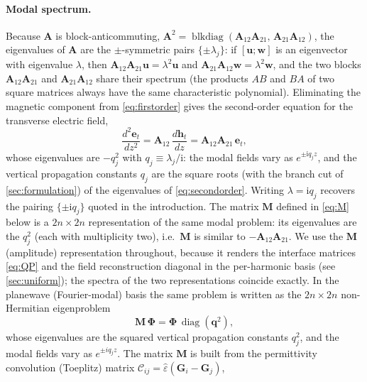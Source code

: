 \documentclass[11pt]{article}
\theoremstyle{remark}
\newcommand{\eps}{\varepsilon}
\newcommand{\Cmat}{\mathcal{C}}
\newcommand{\Ph}{\mathbf{\Phi}}
\newcommand{\fq}{\mathbf{q}}
\DeclareMathOperator{\diag}{diag}
\DeclareMathOperator{\blkdiag}{blkdiag}
\newcommand{\ii}{\mathrm{i}}
\begin{document}
\paragraph{Modal spectrum.}
Because $\mathbf{A}$ is block-anticommuting,
$\mathbf{A}^2=\blkdiag(\mathbf{A}_{12}\mathbf{A}_{21},\,
\mathbf{A}_{21}\mathbf{A}_{12})$, the eigenvalues of $\mathbf{A}$ are the
$\pm$-symmetric pairs $\{\pm\lambda_j\}$: if $[\mathbf{u};\mathbf{w}]$ is an
eigenvector with eigenvalue $\lambda$, then
$\mathbf{A}_{12}\mathbf{A}_{21}\mathbf{u}=\lambda^2\mathbf{u}$ and
$\mathbf{A}_{21}\mathbf{A}_{12}\mathbf{w}=\lambda^2\mathbf{w}$, and the two
blocks $\mathbf{A}_{12}\mathbf{A}_{21}$ and
$\mathbf{A}_{21}\mathbf{A}_{12}$ share their spectrum (the products
$AB$ and $BA$ of two square matrices always have the same characteristic
polynomial).  Eliminating the magnetic
component from \eqref{eq:firstorder} gives the second-order equation for the
transverse electric field,
\begin{equation}
\frac{d^2\mathbf{e}_t}{dz^2}
=\mathbf{A}_{12}\,\frac{d\mathbf{h}_t}{dz}
=\mathbf{A}_{12}\mathbf{A}_{21}\,\mathbf{e}_t,
\label{eq:secondorder}
\end{equation}
whose eigenvalues are $-q_j^2$ with $q_j\equiv\lambda_j/\ii$: the modal fields
vary as $e^{\pm \ii q_j z}$, and the vertical propagation constants
$q_j$ are the square roots (with the branch cut of \cref{sec:formulation}) of
the eigenvalues of \eqref{eq:secondorder}.  Writing $\lambda=\ii q_j$ recovers
the pairing $\{\pm \ii q_j\}$ quoted in the introduction.  The matrix
$\mathbf{M}$ defined in \eqref{eq:M} below is a $2n\times2n$ representation of
the same modal problem: its eigenvalues are the $q_j^2$ (each with multiplicity
two), i.e.\ $\mathbf{M}$ is similar to $-\mathbf{A}_{12}\mathbf{A}_{21}$.  We
use the $\mathbf{M}$ (amplitude) representation throughout, because it renders
the interface matrices \eqref{eq:QP} and the field reconstruction diagonal in
the per-harmonic basis (see \cref{sec:uniform}); the spectra of the two
representations coincide exactly.
In the planewave (Fourier-modal) basis the
same problem is written as the $2n\times2n$ non-Hermitian eigenproblem
\begin{equation}
\mathbf{M}\,\Ph=\Ph\,\diag(\fq^{2}),
\label{eq:eig}
\end{equation}
whose eigenvalues are the squared vertical propagation constants $q_j^2$, and
the modal fields vary as $e^{\pm i q_j z}$. The matrix $\mathbf{M}$ is built
from the permittivity convolution (Toeplitz) matrix
$\Cmat_{ij}=\hat\eps(\mathbf{G}_i-\mathbf{G}_j)$,
\end{document}
